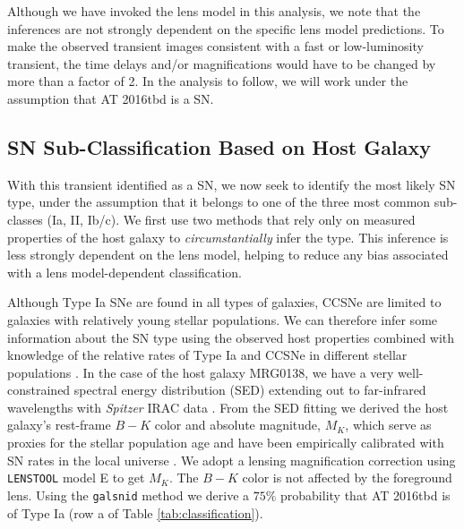 \documentclass[12pt]{article}
\def\SNABC{AT 2016tbd\xspace}
\def\lenstool{{\tt LENSTOOL}\xspace}
\begin{document}
Although we have invoked the lens model in this analysis, we note that the inferences are not strongly dependent on the specific lens model predictions.  To make the observed transient images consistent with a fast or low-luminosity transient, the time delays and/or magnifications would have to be changed by more than a factor of 2.  In the analysis to follow, we will work under the assumption that \SNABC is a SN. 


\subsection*{SN Sub-Classification Based on Host Galaxy}
With this transient identified as a SN, we now seek to identify the most likely SN type, under the assumption that it belongs to one of the three most common sub-classes (Ia, II, Ib/c).   We first use two methods that rely only on measured properties of the host galaxy to {\it circumstantially} infer the type. This inference is less strongly dependent on the lens model, helping to reduce any bias associated with a lens model-dependent classification. 

Although Type Ia SNe are found in all types of galaxies, CCSNe are limited to galaxies with relatively young stellar populations.  We can therefore infer some information about the SN type using the observed host properties combined with knowledge of the relative rates of Type Ia and CCSNe in different stellar populations \cite{mannucci_supernova_2005}.  In the case of the host galaxy MRG0138, we have a very well-constrained spectral energy distribution (SED) extending out to far-infrared wavelengths with \textit{Spitzer} IRAC data \cite{newman_resolving_2018,newman_resolving_2018-1}.  
From the SED fitting we derived the host galaxy's 
rest-frame $B-K$ color and absolute magnitude, $M_K$, which serve as proxies for the stellar population age and have been empirically calibrated with SN rates in the local universe \cite{foley_classifying_2013}.  We adopt a lensing magnification correction using \lenstool model E to get $M_K$.  
The $B-K$ color is not affected by the foreground lens.
Using the {\tt galsnid} method \cite{foley_classifying_2013} we 
derive a $75\%$ probability that \SNABC is of Type Ia (row a of Table \ref{tab:classification}).
\end{document}
